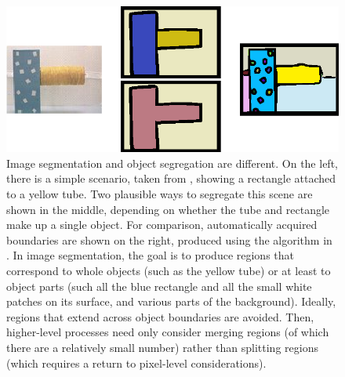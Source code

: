 %



\begin{figure}

\centerline{\includegraphics[width=0.75\columnwidth]{fig-seg}}

\caption{
%
Image segmentation and object segregation are different.  On the left,
there is a simple scenario, taken from ,
showing a rectangle attached to a yellow tube.  Two 
plausible ways to segregate this scene are shown in the middle,
depending on whether the tube and rectangle make up a single 
object.
For
comparison, automatically acquired boundaries are shown on the right,
produced using the algorithm in
. 
In image segmentation, the goal is to
produce regions that correspond to whole objects (such as the yellow
tube) or at least to object parts (such all the blue rectangle and all
the small white patches on its surface, and various parts of the
background).  Ideally, regions that extend across object boundaries
are avoided.  Then, higher-level processes need only consider merging
regions (of which there are a relatively small number) rather than
splitting regions (which requires a return to pixel-level
considerations).  
%
%
}

\label{fig:image-segmentation}

\end{figure}



%
%


